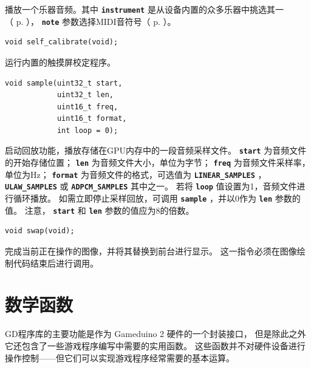 \documentclass[10pt]{book}
\newcommand{\gdtwo}{Gameduino 2 }
\newcommand{\mach}[1]{\texttt{\textbf{#1}}}
\begin{document}
\begin{CJK}{UTF8}{gkai}
播放一个乐器音频。其中 \mach{instrument} 是从设备内置的众多乐器中挑选其一\\
（ p. \pageref{instruments} ）， \mach{note} 参数选择MIDI音符号（ p. \pageref{MIDI} ）。


\begin{framed}
\begin{verbatim}
void self_calibrate(void);
\end{verbatim}
\end{framed}

运行内置的触摸屏校定程序。


\begin{framed}
\begin{verbatim}
void sample(uint32_t start,
            uint32_t len,
            uint16_t freq,
            uint16_t format,
            int loop = 0);
\end{verbatim}
\end{framed}

启动回放功能，播放存储在GPU内存中的一段音频采样文件。
\mach{start} 为音频文件的开始存储位置；
\mach{len} 为音频文件大小，单位为字节；
\mach{freq} 为音频文件采样率，单位为Hz；
\mach{format} 为音频文件的格式，可选值为
\mach{LINEAR\_SAMPLES} ，
\mach{ULAW\_SAMPLES} 或
\mach{ADPCM\_SAMPLES} 其中之一。
若将 \mach{loop} 值设置为1，音频文件进行循环播放。
如需立即停止采样回放，可调用 \mach{sample} ，并以0作为 \mach{len} 参数的值。
注意， \mach{start} 和 \mach{len} 参数的值应为8的倍数。


\begin{framed}
\begin{verbatim}
void swap(void);
\end{verbatim}
\end{framed}

完成当前正在操作的图像，并将其替换到前台进行显示。
这一指令必须在图像绘制代码结束后进行调用。

\chapter{数学函数}

GD程序库的主要功能是作为 \gdtwo 硬件的一个封装接口，
但是除此之外它还包含了一些游戏程序编写中需要的实用函数。
这些函数并不对硬件设备进行操作控制——但它们可以实现游戏程序经常需要的基本运算。


\end{CJK}
\end{document}
